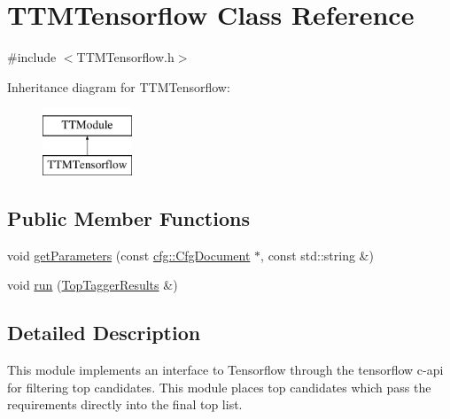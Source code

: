 \hypertarget{classTTMTensorflow}{\section{T\-T\-M\-Tensorflow Class Reference}
\label{classTTMTensorflow}
}


{\ttfamily \#include $<$T\-T\-M\-Tensorflow.\-h$>$}

Inheritance diagram for T\-T\-M\-Tensorflow\-:\begin{figure}[H]
\begin{center}
\leavevmode
\includegraphics[height=2.000000cm]{classTTMTensorflow}
\end{center}
\end{figure}
\subsection*{Public Member Functions}
\begin{DoxyCompactItemize}
\item 
void \hyperlink{classTTMTensorflow_ae8a95bbecd4a21698b64dc95e99f5f0f}{get\-Parameters} (const \hyperlink{classcfg_1_1CfgDocument}{cfg\-::\-Cfg\-Document} $\ast$, const std\-::string \&)
\item 
void \hyperlink{classTTMTensorflow_afe5cdab757948e8eb2713fab0385869b}{run} (\hyperlink{classTopTaggerResults}{Top\-Tagger\-Results} \&)
\end{DoxyCompactItemize}


\subsection{Detailed Description}
This module implements an interface to Tensorflow through the tensorflow c-\/api for filtering top candidates. This module places top candidates which pass the requirements directly into the final top list.


